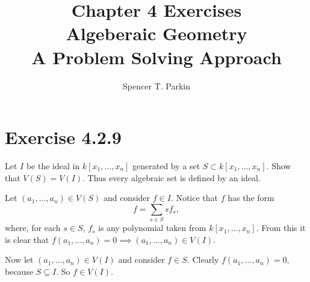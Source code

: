 \documentclass[12pt]{article}
\title{Chapter 4 Exercises\\Algeberaic Geometry\\A Problem Solving Approach}
\author{Spencer T. Parkin}
\begin{document}
\maketitle

\section*{Exercise 4.2.9}

Let $I$ be the ideal in $k[x_1,\dots,x_n]$ generated by a set $S\subset k[x_1,\dots,x_n]$.
Show that $V(S)=V(I)$.  Thus every algebraic set is defined by an ideal.

Let $(a_1,\dots,a_n)\in V(S)$ and consider $f\in I$.  Notice that $f$ has the form
\begin{equation*}
f = \sum_{s\in S} s f_s,
\end{equation*}
where, for each $s\in S$, $f_s$ is any polynomial taken from $k[x_1,\dots,x_n]$.
From this it is clear that $f(a_1,\dots,a_n)=0\implies (a_1,\dots,a_n)\in V(I)$.

Now let $(a_1,\dots,a_n)\in V(I)$ and consider $f\in S$.  Clearly $f(a_1,\dots,a_n)=0$,
because $S\subseteq I$.  So $f\in V(I)$.
\end{document}
